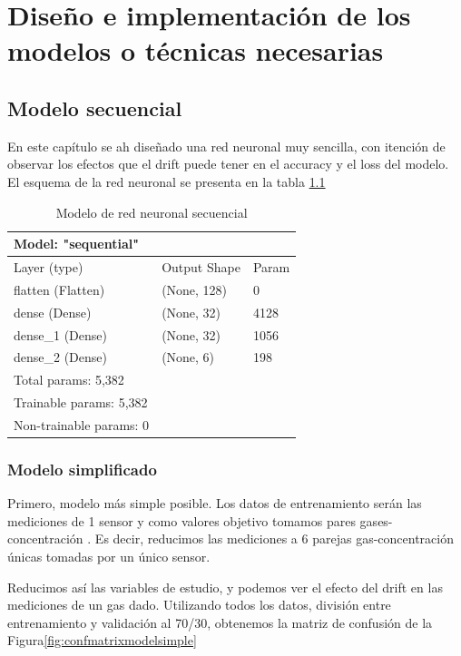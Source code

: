 \chapter{Diseño e implementación de los modelos o técnicas necesarias}


\section{Modelo secuencial}
En este capítulo se ah diseñado una red neuronal muy sencilla, con itención de observar los efectos que el drift puede tener en el accuracy y el loss del modelo. El esquema de la red neuronal se presenta en la tabla \ref{tab:esquemaRNN}

\begin{table}
	\centering
	\begin{tabular}{|l l l|}
		\toprule
		Model: "sequential"  & &   \\ \midrule 
		Layer (type)         &        Output Shape   &         Param  \\ \hline
		flatten (Flatten)    &        (None, 128)    &         0      \\ \hline
		dense (Dense)        &        (None, 32)     &         4128   \\ \hline
		dense\_1 (Dense)     &         (None, 32)    &         1056  \\ \hline
		dense\_2 (Dense)     &         (None, 6)     &         198   \\ \hline
		Total params: 5,382  &                       &     \\ \hline
		Trainable params: 5,382 & & \\ \hline
		Non-trainable params: 0 & & \\ \bottomrule
	\end{tabular}
\caption[Modelo de red neuronal secuencial]{Modelo de red neuronal secuencial \label{tab:esquemaRNN}}
\end{table}

\subsection{Modelo simplificado}

Primero, modelo más simple posible. Los datos de entrenamiento serán las mediciones de 1 sensor y como valores objetivo tomamos pares gases-concentración . Es decir, reducimos las mediciones a 6 parejas gas-concentración únicas tomadas por un único sensor.

Reducimos así las variables de estudio, y podemos ver el efecto del drift en las mediciones de un gas dado. Utilizando todos los datos, división entre entrenamiento y validación al 70/30, obtenemos la matriz de confusión de la Figura\ref{fig:confmatrixmodelsimple}


